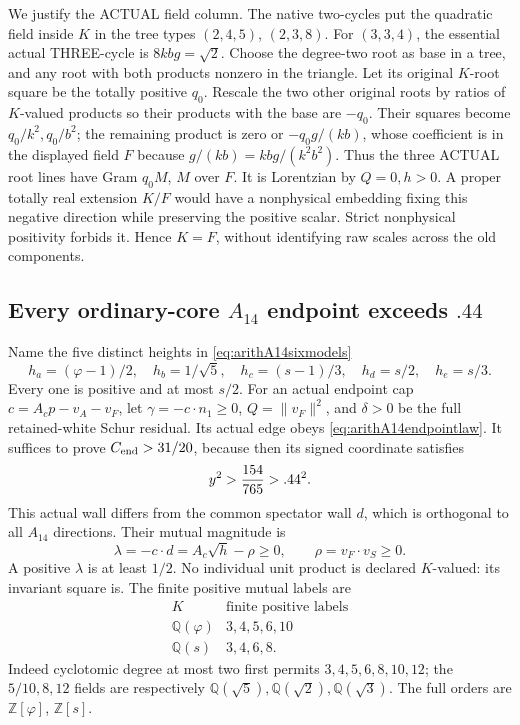 \documentclass[11pt]{article}
\begin{document}
We justify the ACTUAL field column.
The native two-cycles put the quadratic
field inside \(K\) in the tree types
\((2,4,5)\), \((2,3,8)\).
For \((3,3,4)\), the essential actual
THREE-cycle is \(8kbg=\sqrt2\).
Choose the degree-two root as base in a
tree, and any root with both products
nonzero in the triangle.
Let its original \(K\)-root square be
the totally positive \(q_0\).
Rescale the two other original roots by
ratios of \(K\)-valued products so their
products with the base are \(-q_0\).
Their squares become \(q_0/k^2,q_0/b^2\);
the remaining product is zero or
\(-q_0g/(kb)\), whose coefficient is in
the displayed field \(F\) because
\(g/(kb)=kbg/(k^2b^2)\).
Thus the three ACTUAL root lines have
Gram \(q_0M\), \(M\) over \(F\).
It is Lorentzian by \(Q=0,h>0\).
A proper totally real extension \(K/F\)
would have a nonphysical embedding fixing
this negative direction while preserving
the positive scalar.
Strict nonphysical positivity forbids it.
Hence \(K=F\), without identifying raw
scales across the old components.

\subsection{Every ordinary-core \(A_{14}\) endpoint exceeds \(.44\)}
\label{app:arithA14ordinaryends}

Name the five distinct heights in
\eqref{eq:arithA14sixmodels}
\[
 h_a=(\varphi-1)/2,\quad h_b=1/\sqrt5,\quad
 h_c=(s-1)/3,\quad h_d=s/2,\quad h_e=s/3 .
\]
Every one is positive and at most \(s/2\).
For an actual endpoint cap
\(c=A_cp-v_A-v_F\), let
\(\gamma=-c\cdot n_1\ge0\),
\(Q=\|v_F\|^2\), and \(\delta>0\)
be the full retained-white Schur residual.
Its actual edge obeys
\eqref{eq:arithA14endpointlaw}.
It suffices to prove \(C_{\rm end}>31/20\),
because then its signed coordinate satisfies
\[
                           y^2>{154\over765}>.44^2 .
\]
This actual wall differs from the common
spectator wall \(d\), which is orthogonal
to all \(A_{14}\) directions.
Their mutual magnitude is
\[
                \lambda=-c\cdot d=A_c\sqrt h-\rho\ge0,
                         \qquad \rho=v_F\cdot v_S\ge0.
\tag{A14mut}\label{eq:arithA14ordinarymutual}
\]
A positive \(\lambda\) is at least \(1/2\).
No individual unit product is declared
\(K\)-valued: its invariant square is.
The finite positive mutual labels are
\[
 \begin{array}{c|c}
 K&\text{finite positive labels}\\ \hline
 \mathbb Q(\varphi)&3,4,5,6,10\\
 \mathbb Q(s)&3,4,6,8 .
 \end{array}
\]
Indeed cyclotomic degree at most two first
permits \(3,4,5,6,8,10,12\);
the \(5/10,8,12\) fields are respectively
\(\mathbb Q(\sqrt5),\mathbb Q(\sqrt2),\mathbb Q(\sqrt3)\).
The full orders are \(\mathbb Z[\varphi]\),
\(\mathbb Z[s]\).
\end{document}
